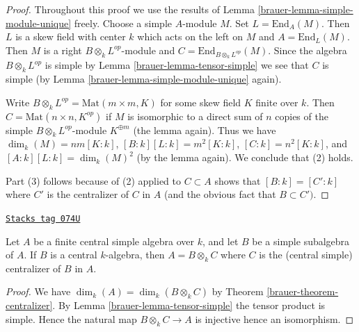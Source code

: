 \begin{proof}

Throughout this proof we use the results of
Lemma \ref{brauer-lemma-simple-module-unique} freely.
Choose a simple $A$-module $M$. Set $L = \text{End}_A(M)$.
Then $L$ is a skew field with center $k$ which acts on the left on $M$
and $A = \text{End}_L(M)$.
Then $M$ is a right $B \otimes_k L^{op}$-module and
$C = \text{End}_{B \otimes_k L^{op}}(M)$.
Since the algebra $B \otimes_k L^{op}$ is simple by
Lemma \ref{brauer-lemma-tensor-simple} we see that $C$ is simple (by
Lemma \ref{brauer-lemma-simple-module-unique} again).

\medskip\noindent
Write $B \otimes_k L^{op} = \text{Mat}(m \times m, K)$ for some
skew field $K$ finite over $k$. Then $C = \text{Mat}(n \times n, K^{op})$
if $M$ is isomorphic to a direct sum of $n$ copies of the simple
$B \otimes_k L^{op}$-module $K^{\oplus m}$ (the lemma again). Thus we have
$\dim_k(M) = nm [K : k]$, $[B : k] [L : k] = m^2 [K : k]$,
$[C : k] = n^2 [K : k]$, and $[A : k] [L : k] = \dim_k(M)^2$ (by
the lemma again). We conclude that (2) holds.

\medskip\noindent
Part (3) follows because of (2) applied to $C \subset A$ shows
that $[B : k] = [C' : k]$ where $C'$ is the centralizer of $C$ in $A$
(and the obvious fact that $B \subset C')$.
\end{proof}

\begin{lemma}
\label{brauer-lemma-when-tensor-is-equal}
\href{https://stacks.math.columbia.edu/tag/074U}{\texttt{Stacks tag 074U}}

Let $A$ be a finite central simple algebra over $k$, and let
$B$ be a simple subalgebra of $A$. If $B$ is a central
$k$-algebra, then $A = B \otimes_k C$ where $C$ is the (central simple)
centralizer of $B$ in $A$.
\end{lemma}

\begin{proof}

We have $\dim_k(A) = \dim_k(B \otimes_k C)$ by
Theorem \ref{brauer-theorem-centralizer}. By
Lemma \ref{brauer-lemma-tensor-simple}
the tensor product is simple. Hence the natural map
$B \otimes_k C \to A$ is injective hence an isomorphism.
\end{proof}

